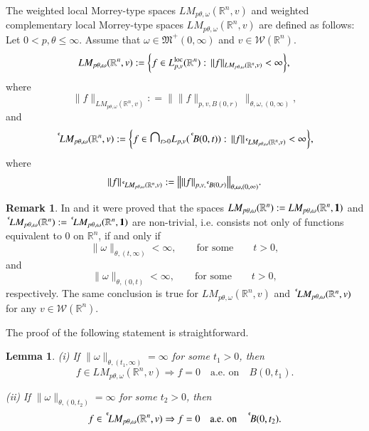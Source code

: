 \documentclass[11pt]{amsart}
\theoremstyle{plain}
\newtheorem{lem}[thm]{Lemma}
\theoremstyle{definition}
\newtheorem{rem}[thm]{Remark}
\numberwithin{thm}{section}
\numberwithin{equation}{section}
\begin{document}
The weighted local Morrey-type spaces ${LM_{p{\theta},{\omega}}({{\mathbb R}^n},v)}$ and weighted complementary
local Morrey-type spaces ${LM_{p{\theta},{\omega}}({{\mathbb R}^n},v)}$ are defined as follows: Let  $0 <p, \theta \le \infty$. 
Assume that ${\omega} \in {{\mathfrak M}}^+ {(0,{\infty})}$ and $v \in{{\mathcal W}}({{\mathbb R}^n})$.      
$$
{LM_{p{\theta},{\omega}}({{\mathbb R}^n},v)} : = \bigg\{f\in L_{p,v}^{\operatorname{loc}}({{\mathbb R}^n}):\, \| f \|_{LM_{p{\theta},{\omega}}({{\mathbb R}^n},v)} < \infty\bigg\}, \\
$$
where
$$
\| f \|_{LM_{p{\theta},{\omega}}({{\mathbb R}^n},v)} : = \big\| \|f\|_{p,v,{{B(0,r)}}} \big\|_{{\theta},{\omega},(0,\infty)},
$$
and
$$
{{\,^{^{\bf c}}\!}{LM_{p{\theta},{\omega}}({{\mathbb R}^n},v)}} :  = \bigg\{f\in {\mathbin{\scalebox{1.7}{\ensuremath{\cap}}}}_{t>0} L_{p,v}({\,^{^{\bf c}}\!} B(0,t)):\,\| f\|_{{\,^{^{\bf c}}\!}{LM_{p{\theta},{\omega}}({{\mathbb R}^n},v)}}  < \infty\bigg\},
$$
where
$$
\| f\|_{{\,^{^{\bf c}}\!}{LM_{p{\theta},{\omega}}({{\mathbb R}^n},v)}} : = \big\| \|f\|_{p,v,{{\,^{^{\bf c}}\!}{{B(0,r)}}}} \big\|_{{\theta},{\omega}, (0,\infty)}.
$$
\begin{rem}
	In \cite{BurHus1} and \cite{BurGulHus1} it were proved that the
	spaces ${LM_{p{\theta},{\omega}}} ({{\mathbb R}^n}) : = {LM_{p{\theta},{\omega}}} ({{\mathbb R}^n}, \bf 1)$ and ${{\,^{^{\bf c}}\!}{LM_{p{\theta},{\omega}}}} ({{\mathbb R}^n}) : = {{\,^{^{\bf c}}\!}{LM_{p{\theta},{\omega}}}}
	({{\mathbb R}^n}, \bf 1)$ are non-trivial, i.e. consists not only of functions
	equivalent to $0$ on ${{\mathbb R}^n}$, if and only if
	\begin{equation}\label{11111}
	\|{\omega}\|_{{\theta},(t,{\infty})} < {\infty}, {\qquad} \mbox{for some} {\qquad} t >0,
	\end{equation}
	and
	\begin{equation}\label{1111111}
	\|{\omega}\|_{{\theta},(0,t)} < {\infty},{\qquad} \mbox{for some} {\qquad} t >0,
	\end{equation}
	respectively. The same conclusion is true for ${LM_{p{\theta},{\omega}}({{\mathbb R}^n},v)}$ and ${{\,^{^{\bf c}}\!}{LM_{p{\theta},{\omega}}({{\mathbb R}^n},v)}}$ for
	any $v \in {{\mathcal W}}({{\mathbb R}^n})$.
\end{rem}

The proof of the following statement is straightforward.
\begin{lem} \label{shrinkagelemma}
	\rm{(i)} If $\|{\omega}\|_{{\theta},(t_1,\infty)} = \infty$ for some $t_1 > 0$, then
	$$
	f\in {LM_{p{\theta},{\omega}}({{\mathbb R}^n},v)} \Rightarrow f = 0 \quad \mbox{a.e. on} \quad B(0,t_1).
	$$
	
	\rm{(ii)} If $\|{\omega}\|_{{\theta},(0,t_2)} = \infty$ for some $t_2 > 0$, then
	$$
	f\in {{\,^{^{\bf c}}\!}{LM_{p{\theta},{\omega}}({{\mathbb R}^n},v)}} \Rightarrow f = 0 \quad \mbox{a.e. on} \quad {\,^{^{\bf c}}\!} B(0,t_2).
	$$
\end{lem}
\end{document}
